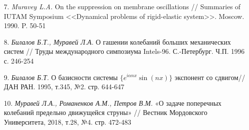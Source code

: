 7. {\it Muravey L.A.} On the suppression on membrane oscillations // Summaries of IUTAM Symposium <<Dynamical problems of rigid-elastic system>>. Moscow. 1990. P. 50-51

8. {\it Билалов Б.Т., Муравей Л.А.} О гашении колебаний больших механических систем // Труды международного симпозиума Intels-96. С.-Петербург. Ч.П. 1996 с. 246-254

9. {\it Билалов Б.Т.} О базисности системы $\{e^{i\alpha nx}\sin(nx)\}$ экспонент со сдвигом// ДАН РАН. 1995, т.345, №2. стр. 644-647

10. {\it Муравей Л.А., Романенков А.М., Петров В.М.} «О задаче поперечных колебаний предельно движущейся струны» // Вестник Мордовского Университета, 2018, т.28, №4. стр. 472-483
